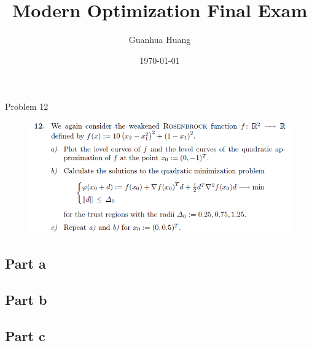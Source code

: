 \documentclass[12pt]{article}
\title{Modern Optimization Final Exam}
\author{Guanhua Huang}
\date\today
\begin{document}
\maketitle %
\begin{section}{Problem 12}
	\begin{figure}[htp]
		\centering
		\includegraphics[width=12cm]{problem12.png}
	\end{figure}
\subsection{Part a}
\subsection{Part b}
\subsection{Part c}
\end{section}
\end{document}

